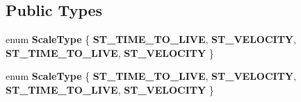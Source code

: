 \subsection*{Public Types}
\begin{DoxyCompactItemize}
\item 
\mbox{\label{classPUDoScaleEventHandler_a55e7a5f93a9e3bf474996ec7cbca064d}} 
enum {\bfseries Scale\+Type} \{ {\bfseries S\+T\+\_\+\+T\+I\+M\+E\+\_\+\+T\+O\+\_\+\+L\+I\+VE}, 
{\bfseries S\+T\+\_\+\+V\+E\+L\+O\+C\+I\+TY}, 
{\bfseries S\+T\+\_\+\+T\+I\+M\+E\+\_\+\+T\+O\+\_\+\+L\+I\+VE}, 
{\bfseries S\+T\+\_\+\+V\+E\+L\+O\+C\+I\+TY}
 \}
\item 
\mbox{\label{classPUDoScaleEventHandler_a55e7a5f93a9e3bf474996ec7cbca064d}} 
enum {\bfseries Scale\+Type} \{ {\bfseries S\+T\+\_\+\+T\+I\+M\+E\+\_\+\+T\+O\+\_\+\+L\+I\+VE}, 
{\bfseries S\+T\+\_\+\+V\+E\+L\+O\+C\+I\+TY}, 
{\bfseries S\+T\+\_\+\+T\+I\+M\+E\+\_\+\+T\+O\+\_\+\+L\+I\+VE}, 
{\bfseries S\+T\+\_\+\+V\+E\+L\+O\+C\+I\+TY}
 \}
\end{DoxyCompactItemize}
